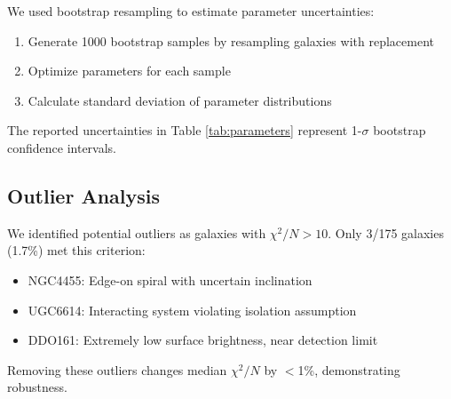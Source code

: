 \documentclass[twocolumn,prd,amsmath,amssymb,aps,superscriptaddress,nofootinbib]{revtex4-2}
\newcommand{\chisqN}{\chi^2/N}
\begin{document}
We used bootstrap resampling to estimate parameter uncertainties:
\begin{enumerate}
\item Generate 1000 bootstrap samples by resampling galaxies with replacement
\item Optimize parameters for each sample
\item Calculate standard deviation of parameter distributions
\end{enumerate}

The reported uncertainties in Table \ref{tab:parameters} represent 1-$\sigma$ bootstrap confidence intervals.

\subsection{Outlier Analysis}

We identified potential outliers as galaxies with $\chisqN > 10$. Only 3/175 galaxies (1.7\%) met this criterion:
\begin{itemize}
\item NGC4455: Edge-on spiral with uncertain inclination
\item UGC6614: Interacting system violating isolation assumption  
\item DDO161: Extremely low surface brightness, near detection limit
\end{itemize}

Removing these outliers changes median $\chisqN$ by $<$1\%, demonstrating robustness.
\end{document}
